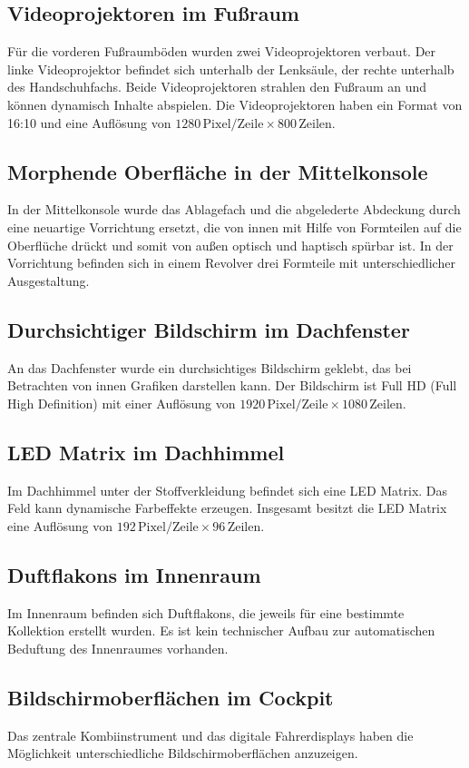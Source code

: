 \subsection{Videoprojektoren im Fußraum}
Für die vorderen Fußraumböden wurden zwei Videoprojektoren verbaut. Der linke Videoprojektor befindet sich unterhalb der Lenksäule, der rechte unterhalb des Handschuhfachs. Beide Videoprojektoren strahlen den Fußraum an und können dynamisch Inhalte abspielen.
Die Videoprojektoren haben ein Format von 16:10 und eine Auflösung von $ 1280\,\mathrm{Pixel}/\mathrm{Zeile} \times 800\,\mathrm{Zeilen} $.
\subsection{Morphende Oberfläche in der Mittelkonsole}
In der Mittelkonsole wurde das Ablagefach und die abgelederte Abdeckung durch eine neuartige Vorrichtung ersetzt, die von innen mit Hilfe von Formteilen auf die Oberflüche drückt und somit von außen optisch und haptisch spürbar ist. In der Vorrichtung befinden sich in einem Revolver drei Formteile mit unterschiedlicher Ausgestaltung.
\subsection{Durchsichtiger Bildschirm im Dachfenster}
An das Dachfenster wurde ein durchsichtiges Bildschirm geklebt, das bei Betrachten von innen Grafiken darstellen kann.
Der Bildschirm ist Full HD (Full High Definition) mit einer Auflösung von $ 1920 \,\mathrm{Pixel}/\mathrm{Zeile} \times 1080 \,\mathrm{Zeilen} $.
\subsection{LED Matrix im Dachhimmel}
Im Dachhimmel unter der Stoffverkleidung befindet sich eine LED Matrix. Das Feld kann dynamische Farbeffekte erzeugen.
Insgesamt besitzt die LED Matrix eine Auflösung von $ 192 \,\mathrm{Pixel}/\mathrm{Zeile} \times 96 \,\mathrm{Zeilen} $.
\subsection{Duftflakons im Innenraum}
Im Innenraum befinden sich Duftflakons, die jeweils für eine bestimmte Kollektion erstellt wurden. Es ist kein technischer Aufbau zur automatischen Beduftung des Innenraumes vorhanden.
\subsection{Bildschirmoberflächen im Cockpit}
Das zentrale Kombiinstrument und das digitale Fahrerdisplays haben die Möglichkeit unterschiedliche Bildschirmoberflächen anzuzeigen.
